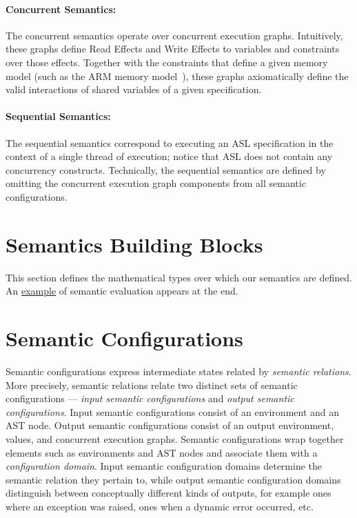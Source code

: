 \paragraph{Concurrent Semantics:}
The concurrent semantics operate over concurrent execution graphs.
Intuitively, these graphs define Read Effects and Write Effects to variables and constraints over those effects.
Together with the constraints that define a given memory model (such as the ARM memory model~\cite{AlglaveDGHM21}),
these graphs axiomatically define
the valid interactions of shared variables of a given specification.

\paragraph{Sequential Semantics:}
The sequential semantics correspond to executing an ASL specification in the context of a single thread
of execution; notice that ASL does not contain any concurrency constructs.
%
Technically, the sequential semantics are defined by omitting the concurrent execution graph components
from all semantic configurations.

\section{Semantics Building Blocks}
\label{sec:semanticsbuildingblocks}
This section defines the mathematical types over which our semantics are defined.
An \hyperlink{eval-example}{example} of semantic evaluation appears at the end.

\section{Semantic Configurations\label{sec:SemanticConfigurations}}

Semantic configurations express intermediate states related by \emph{semantic relations}.
%
More precisely, semantic relations relate two distinct sets of semantic configurations ---
\emph{input semantic configurations} and \emph{output semantic configurations}.
Input semantic configurations consist of an environment and an AST node.
Output semantic configurations consist of an output environment, values,
and concurrent execution graphs.
%
Semantic configurations wrap together elements such as environments and AST nodes
and associate them with a \emph{configuration domain}. Input semantic configuration domains
determine the semantic relation they pertain to, while output semantic configuration
domains distinguish between conceptually different kinds of outputs, for example
ones where an exception was raised, ones when a dynamic error occurred, etc.

